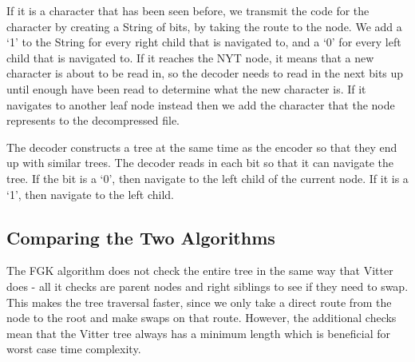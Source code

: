 \documentclass[12pt, letterpaper]{article}
\begin{document}
If it is a character that has been seen before, we transmit the code for the character by creating a String of bits, by taking the route to the node. We add a ‘1’ to the String for every right child that is navigated to, and a ‘0’ for every left child that is navigated to. If it reaches the NYT node, it means that a new character is about to be read in, so the decoder needs to read in the next bits up until enough have been read to determine what the new character is. If it navigates to another leaf node instead then we add the character that the node represents to the decompressed file.

The decoder constructs a tree at the same time as the encoder so that they end up with similar trees. The decoder reads in each bit so that it can navigate the tree. If the bit is a ‘0’, then navigate to the left child of the current node. If it is a ‘1’, then navigate to the left child.
\subsection{Comparing the Two Algorithms}
The FGK algorithm does not check the entire tree in the same way that Vitter does - all it checks are parent nodes and right siblings to see if they need to swap. This makes the tree traversal faster, since we only take a direct route from the node to the root and make swaps on that route.
However, the additional checks mean that the Vitter tree always has a minimum length which is beneficial for worst case time complexity.
\newpage
\end{document}
